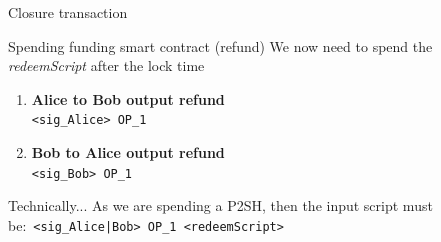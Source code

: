 \documentclass{beamer}
\begin{document}
\begin{frame}{Closure transaction}
 \begin{exampleblock}{Spending funding smart contract (refund)}
  We now need to spend the \textit{redeemScript} after the lock time
  \pause
  \begin{center}
   \begin{enumerate}[<+->]
    \item \textbf{Alice to Bob output refund}\\
          \texttt{<sig\_Alice> OP\_1}
    \item \textbf{Bob to Alice output refund}\\
          \texttt{<sig\_Bob> OP\_1}
   \end{enumerate}
  \end{center}
 \end{exampleblock}
 \pause
 \begin{exampleblock}{Technically...}
  As we are spending a P2SH, then the input script must be:\
  \texttt{<sig\_Alice|Bob> OP\_1 <redeemScript>}
 \end{exampleblock}
\end{frame}
\end{document}
